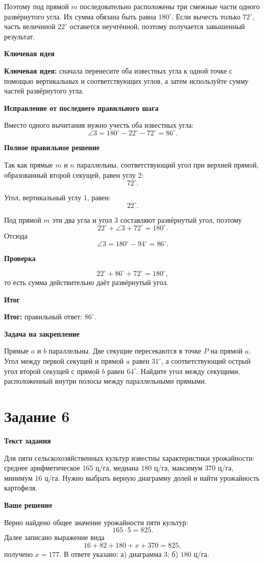 \documentclass[12pt,a4paper]{article}
\newcommand{\keyidea}{\textcolor{blue!60!black}{\textbf{Ключевая идея:}}}
\newcommand{\resultlabel}{\textcolor{teal!60!black}{\textbf{Итог:}}}
\newcommand{\subhead}[1]{\par\medskip\textbf{#1}\par}
\begin{document}
Поэтому под прямой $m$ последовательно расположены три смежные части одного развёрнутого угла. Их сумма обязана быть равна $180^\circ$. Если вычесть только $72^\circ$, часть величиной $22^\circ$ останется неучтённой, поэтому получается завышенный результат.

\subhead{Ключевая идея}
\keyidea{} сначала перенесите оба известных угла к одной точке с помощью вертикальных и соответствующих углов, а затем используйте сумму частей развёрнутого угла.

\subhead{Исправление от последнего правильного шага}
Вместо одного вычитания нужно учесть оба известных угла:
\[
\angle 3=180^\circ-22^\circ-72^\circ=86^\circ.
\]

\subhead{Полное правильное решение}
Так как прямые $m$ и $n$ параллельны, соответствующий угол при верхней прямой, образованный второй секущей, равен углу 2:
\[
72^\circ.
\]

Угол, вертикальный углу 1, равен:
\[
22^\circ.
\]

Под прямой $m$ эти два угла и угол 3 составляют развёрнутый угол, поэтому
\[
22^\circ+\angle 3+72^\circ=180^\circ.
\]
Отсюда
\[
\angle 3=180^\circ-94^\circ=86^\circ.
\]

\subhead{Проверка}
\[
22^\circ+86^\circ+72^\circ=180^\circ,
\]
то есть сумма действительно даёт развёрнутый угол.

\subhead{Итог}
\resultlabel{} правильный ответ: $86^\circ$.

\subhead{Задача на закрепление}
Прямые $a$ и $b$ параллельны. Две секущие пересекаются в точке $P$ на прямой $a$. Угол между первой секущей и прямой $a$ равен $31^\circ$, а соответствующий острый угол второй секущей с прямой $b$ равен $64^\circ$. Найдите угол между секущими, расположенный внутри полосы между параллельными прямыми.

\newpage
{}\label{task:6}
\section*{Задание 6}

\subhead{Текст задания}
Для пяти сельскохозяйственных культур известны характеристики урожайности: среднее арифметическое $165$ ц/га, медиана $180$ ц/га, максимум $370$ ц/га, минимум $16$ ц/га. Нужно выбрать верную диаграмму долей и найти урожайность картофеля.

\subhead{Ваше решение}
Верно найдено общее значение урожайности пяти культур:
\[
165\cdot 5=825.
\]
Далее записано выражение вида
\[
16+82+180+x+370=825,
\]
получено $x=177$. В ответе указано: а) диаграмма 3; б) $180$ ц/га.
\end{document}
